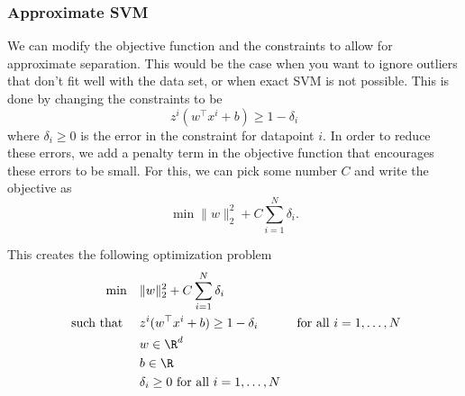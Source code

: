 %
%
%
%
%
%
%
%
%
%
%
%
\subsubsection{Approximate SVM}
We can modify the objective function and the constraints to allow for approximate separation.  This would be the case when you want to ignore outliers that don't fit well with the data set, or when exact SVM is not possible.  This is done by changing the constraints to be 
$$
z^i( w^\top x^i + b) \geq 1 - \delta_i
$$
where $\delta_i\geq 0$ is the error in the constraint for datapoint $i$.  In order to reduce these errors, we add a penalty term in the objective function that encourages these errors to be small.  For this, we can pick some number $C$ and write the objective as 
$$
\min  \|w\|_2^2  + C \sum_{i=1}^N \delta_i.
$$

This creates the following optimization problem
\begin{align*}
\min \quad & \|w\|_2^2+ C \sum_{i=1}^N \delta_i \\
\text{ such that } \quad & z^i( w^\top x^i + b) \geq 1  - \delta_i& \text{ for all } i=1, \dots, N\\
& w  \in \R^d\\
& b \in \R\\
& \delta_i \geq 0  \text { for all } i =1, \dots, N
\end{align*}



